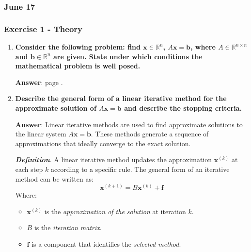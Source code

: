 \subsubsection{June 17}

\subsubsection*{Exercise 1 - Theory}

\begin{enumerate}[label=\textcolor{Green3}{\textbf{\arabic*.}}]
    \item \textcolor{Green3}{\textbf{%
        Consider the following problem: find $\mathbf{x} \in \mathbb{R}^{n}$, $A\mathbf{x} = \mathbf{b}$, where $A \in \mathbb{R}^{n \times n}$ and $\mathbf{b} \in \mathbb{R}^{n}$ are given. State under which conditions the mathematical problem is well posed.
    }}

    \textbf{Answer}: page .




    \item \textcolor{Green3}{\textbf{%
        Describe the general form of a linear iterative method for the approximate solution of $A\mathbf{x} = \mathbf{b}$ and describe the stopping criteria.
    }}

    \textbf{Answer}: Linear iterative methods are used to find approximate solutions to the linear system $A\mathbf{x} = \mathbf{b}$. These methods generate a sequence of approximations that ideally converge to the exact solution.

    \textbf{\emph{Definition}}. A linear iterative method updates the approximation $\mathbf{x}^{(k)}$ at each step $k$ according to a specific rule. The general form of an iterative method can be written as:
    \begin{equation*}
        \mathbf{x}^{(k+1)} = B \mathbf{x}^{(k)} + \mathbf{f}
    \end{equation*}
    Where:
    \begin{itemize}
        \item $\mathbf{x}^{(k)}$ is the \emph{approximation of the solution} at iteration $k$.
        \item $B$ is the \emph{iteration matrix}.
        \item $\mathbf{f}$ is a component that identifies the \emph{selected method}.
    \end{itemize}


\end{enumerate}
